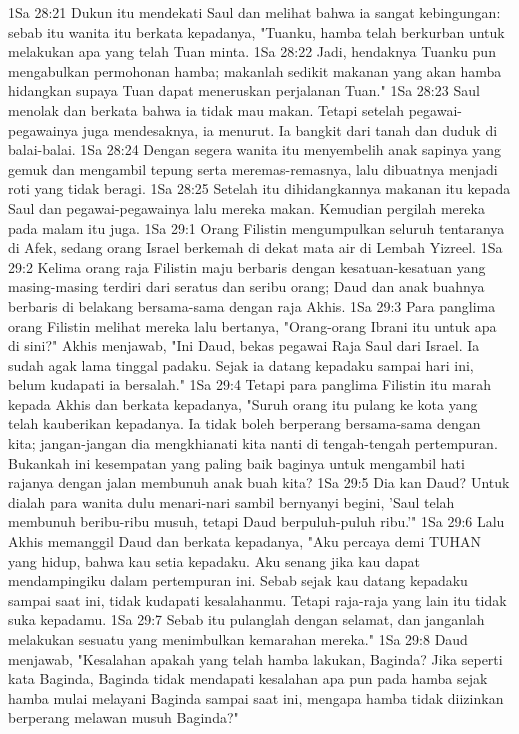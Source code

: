 1Sa 28:21  Dukun itu mendekati Saul dan melihat bahwa ia sangat kebingungan: sebab itu wanita itu berkata kepadanya, "Tuanku, hamba telah berkurban untuk melakukan apa yang telah Tuan minta.
1Sa 28:22  Jadi, hendaknya Tuanku pun mengabulkan permohonan hamba; makanlah sedikit makanan yang akan hamba hidangkan supaya Tuan dapat meneruskan perjalanan Tuan."
1Sa 28:23  Saul menolak dan berkata bahwa ia tidak mau makan. Tetapi setelah pegawai-pegawainya juga mendesaknya, ia menurut. Ia bangkit dari tanah dan duduk di balai-balai.
1Sa 28:24  Dengan segera wanita itu menyembelih anak sapinya yang gemuk dan mengambil tepung serta meremas-remasnya, lalu dibuatnya menjadi roti yang tidak beragi.
1Sa 28:25  Setelah itu dihidangkannya makanan itu kepada Saul dan pegawai-pegawainya lalu mereka makan. Kemudian pergilah mereka pada malam itu juga.
1Sa 29:1  Orang Filistin mengumpulkan seluruh tentaranya di Afek, sedang orang Israel berkemah di dekat mata air di Lembah Yizreel.
1Sa 29:2  Kelima orang raja Filistin maju berbaris dengan kesatuan-kesatuan yang masing-masing terdiri dari seratus dan seribu orang; Daud dan anak buahnya berbaris di belakang bersama-sama dengan raja Akhis.
1Sa 29:3  Para panglima orang Filistin melihat mereka lalu bertanya, "Orang-orang Ibrani itu untuk apa di sini?" Akhis menjawab, "Ini Daud, bekas pegawai Raja Saul dari Israel. Ia sudah agak lama tinggal padaku. Sejak ia datang kepadaku sampai hari ini, belum kudapati ia bersalah."
1Sa 29:4  Tetapi para panglima Filistin itu marah kepada Akhis dan berkata kepadanya, "Suruh orang itu pulang ke kota yang telah kauberikan kepadanya. Ia tidak boleh berperang bersama-sama dengan kita; jangan-jangan dia mengkhianati kita nanti di tengah-tengah pertempuran. Bukankah ini kesempatan yang paling baik baginya untuk mengambil hati rajanya dengan jalan membunuh anak buah kita?
1Sa 29:5  Dia kan Daud? Untuk dialah para wanita dulu menari-nari sambil bernyanyi begini, 'Saul telah membunuh beribu-ribu musuh, tetapi Daud berpuluh-puluh ribu.'"
1Sa 29:6  Lalu Akhis memanggil Daud dan berkata kepadanya, "Aku percaya demi TUHAN yang hidup, bahwa kau setia kepadaku. Aku senang jika kau dapat mendampingiku dalam pertempuran ini. Sebab sejak kau datang kepadaku sampai saat ini, tidak kudapati kesalahanmu. Tetapi raja-raja yang lain itu tidak suka kepadamu.
1Sa 29:7  Sebab itu pulanglah dengan selamat, dan janganlah melakukan sesuatu yang menimbulkan kemarahan mereka."
1Sa 29:8  Daud menjawab, "Kesalahan apakah yang telah hamba lakukan, Baginda? Jika seperti kata Baginda, Baginda tidak mendapati kesalahan apa pun pada hamba sejak hamba mulai melayani Baginda sampai saat ini, mengapa hamba tidak diizinkan berperang melawan musuh Baginda?"
